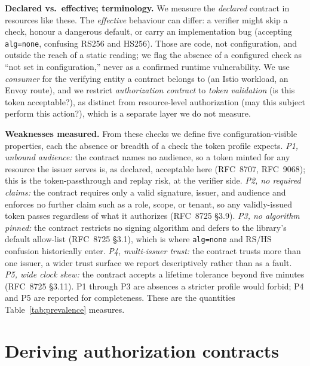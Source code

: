 \noindent\textbf{Declared vs.\ effective; terminology.} We measure the
\emph{declared} contract in resources like these. The \emph{effective} behaviour
can differ: a verifier might skip a check, honour a dangerous default, or carry an
implementation bug (accepting \texttt{alg=none}, confusing RS256 and HS256). Those
are code, not configuration, and outside the reach of a static reading; we flag the
absence of a configured check as ``not set in configuration,'' never as a confirmed
runtime vulnerability. We use \emph{consumer} for the verifying entity a contract
belongs to (an Istio workload, an Envoy route), and we restrict \emph{authorization
contract} to \emph{token validation} (is this token acceptable?), as distinct from
resource-level authorization (may this subject perform this action?), which is a
separate layer we do not measure.

\noindent\textbf{Weaknesses measured.} From these checks we define five
configuration-visible properties, each the absence or breadth of a check the token
profile expects. \emph{P1, unbound audience:} the contract names no audience, so a
token minted for any resource the issuer serves is, as declared, acceptable here
(RFC~8707, RFC~9068); this is the token-passthrough and replay risk, at the verifier
side. \emph{P2, no required claims:} the contract requires only a valid signature,
issuer, and audience and enforces no further claim such as a role, scope, or tenant,
so any validly-issued token passes regardless of what it authorizes (RFC~8725
\S3.9). \emph{P3, no algorithm pinned:} the contract restricts no signing algorithm
and defers to the library's default allow-list (RFC~8725 \S3.1), which is where
\texttt{alg=none} and RS/HS confusion historically enter. \emph{P4, multi-issuer
trust:} the contract trusts more than one issuer, a wider trust surface we report
descriptively rather than as a fault. \emph{P5, wide clock skew:} the contract
accepts a lifetime tolerance beyond five minutes (RFC~8725 \S3.11). P1 through P3 are
absences a stricter profile would forbid; P4 and P5 are reported for completeness.
These are the quantities Table~\ref{tab:prevalence} measures.

\section{Deriving authorization contracts}\label{sec:method}

